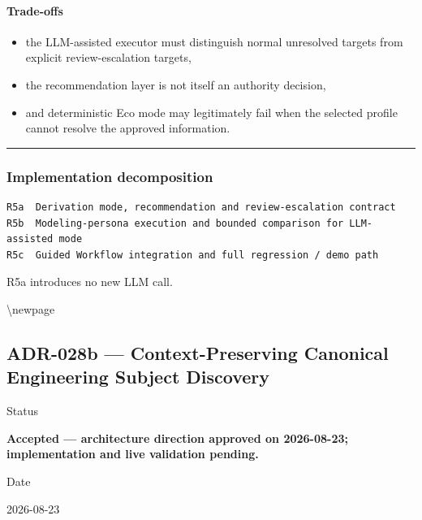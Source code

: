 \hypertarget{trade-offs-6}{%
\paragraph{Trade-offs}\label{trade-offs-6}}

\begin{itemize}
\tightlist
\item
  the LLM-assisted executor must distinguish normal unresolved targets from explicit review-escalation targets,
\item
  the recommendation layer is not itself an authority decision,
\item
  and deterministic Eco mode may legitimately fail when the selected profile cannot resolve the approved information.
\end{itemize}

\begin{center}\rule{0.5\linewidth}{0.5pt}\end{center}

\hypertarget{implementation-decomposition-1}{%
\subsubsection{Implementation decomposition}\label{implementation-decomposition-1}}

\begin{verbatim}
R5a  Derivation mode, recommendation and review-escalation contract
R5b  Modeling-persona execution and bounded comparison for LLM-assisted mode
R5c  Guided Workflow integration and full regression / demo path
\end{verbatim}

R5a introduces no new LLM call.

\textbackslash newpage

\hypertarget{adr-028b--context-preserving-canonical-engineering-subject-discovery}{%
\subsection{ADR-028b --- Context-Preserving Canonical Engineering Subject Discovery}\label{adr-028b--context-preserving-canonical-engineering-subject-discovery}}

Status

\textbf{Accepted --- architecture direction approved on 2026-08-23; implementation and live validation pending.}

Date

2026-08-23

